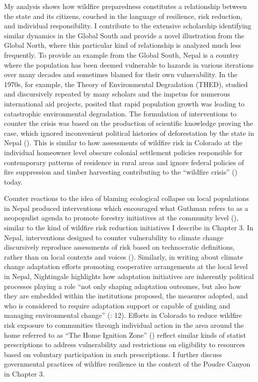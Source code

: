 \documentclass[
]{article}
\begin{document}
My analysis shows how wildfire preparedness constitutes a relationship between the state and its citizens, couched in the language of resilience, risk reduction, and individual responsibility. I contribute to the extensive scholarship identifying similar dynamics in the Global South and provide a novel illustration from the Global North, where this particular kind of relationship is analyzed much less frequently. To provide an example from the Global South, Nepal is a country where the population has been deemed vulnerable to hazards in various iterations over many decades and sometimes blamed for their own vulnerability. In the 1970s, for example, the Theory of Environmental Degradation (THED), studied and discursively repeated by many scholars and the impetus for numerous international aid projects, posited that rapid population growth was leading to catastrophic environmental degradation. The formulation of interventions to counter the crisis was based on the production of scientific knowledge proving the case, which ignored inconvenient political histories of deforestation by the state in Nepal (). This is similar to how assessments of wildfire risk in Colorado at the individual homeowner level obscure colonial settlement policies responsible for contemporary patterns of residence in rural areas and ignore federal policies of fire suppression and timber harvesting contributing to the ``wildfire crisis'' () today.

Counter reactions to the idea of blaming ecological collapse on local populations in Nepal produced interventions which encouraged what Guthman refers to as a neopopulist agenda to promote forestry initiatives at the community level (), similar to the kind of wildfire risk reduction initiatives I describe in Chapter 3. In Nepal, interventions designed to counter vulnerability to climate change discursively reproduce assessments of risk based on technocratic definitions, rather than on local contexts and voices (). Similarly, in writing about climate change adaptation efforts promoting cooperative arrangements at the local level in Nepal, Nightingale highlights how adaptation initiatives are inherently political processes playing a role ``not only shaping adaptation outcomes, but also how they are embedded within the institutions proposed, the measures adopted, and who is considered to require adaptation support or capable of guiding and managing environmental change'' (: 12). Efforts in Colorado to reduce wildfire risk exposure to communities through individual action in the area around the home referred to as ``The Home Ignition Zone'' () reflect similar kinds of statist prescriptions to address vulnerability and restrictions on eligibility to resources based on voluntary participation in such prescriptions. I further discuss governmental practices of wildfire resilience in the context of the Poudre Canyon in Chapter 3.
\end{document}

